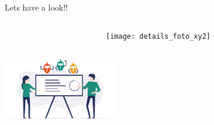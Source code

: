 \documentclass{beamer}
\begin{document}
\begin{frame}{Lets have a look!!}
	\begin{columns}
		\begin{column}{5cm}
			\small 
		\end{column}
		\begin{column}{5cm}
			\begin{center}
				\texttt{[image: details\_foto\_xy2]}
				
				
			\end{center}
		\end{column}
	\end{columns}
	\begin{columns}
		\begin{column}{5cm}
			\begin{center}
				\includegraphics[width=5cm]{details_foto_xy1}
				
				
			\end{center}
		\end{column}
		\begin{column}{5cm}
			\begin{block}{\small }
				\scriptsize
				
			\end{block}
		\end{column}
	\end{columns}
\end{frame}
\end{document}
